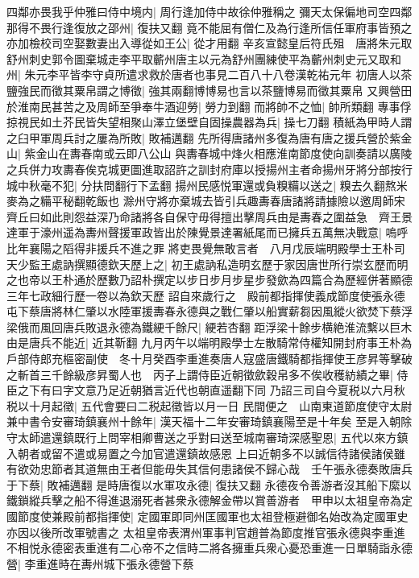 四鄰亦畏我乎仲雅曰侍中境内|{
	周行逢加侍中故徐仲雅稱之}
彌天太保徧地司空四鄰那得不畏行逢復放之邵州|{
	復扶又翻}
竟不能屈有僧仁及為行逢所信任軍府事皆預之亦加檢校司空娶數妻出入導從如王公|{
	從才用翻}
辛亥宣懿皇后符氏殂　唐將朱元取舒州刺史郭令圖棄城走李平取蘄州唐主以元為舒州團練使平為蘄州刺史元又取和州|{
	朱元李平皆李守貞所遣求救於唐者也事見二百八十八卷漢乾祐元年}
初唐人以茶鹽強民而徵其粟帛謂之博徵|{
	強其兩翻博博易也言以茶鹽博易而徵其粟帛}
又興營田於淮南民甚苦之及周師至爭奉牛酒迎勞|{
	勞力到翻}
而將帥不之恤|{
	帥所類翻}
專事俘掠視民如土芥民皆失望相聚山澤立堡壁自固操農器為兵|{
	操七刀翻}
積紙為甲時人謂之臼甲軍周兵討之屢為所敗|{
	敗補邁翻}
先所得唐諸州多復為唐有唐之援兵營於紫金山|{
	紫金山在夀春南或云即八公山}
與夀春城中烽火相應淮南節度使向訓奏請以廣陵之兵併力攻夀春俟克城更圖進取詔許之訓封府庫以授揚州主者命揚州牙將分部按行城中秋毫不犯|{
	分扶問翻行下孟翻}
揚州民感悦軍還或負糗糒以送之|{
	糗去久翻熬米麥為之糒平秘翻乾飯也}
滁州守將亦棄城去皆引兵趣夀春唐諸將請據險以邀周師宋齊丘曰如此則怨益深乃命諸將各自保守毋得擅出擊周兵由是夀春之圍益急　齊王景達軍于濠州遥為夀州聲援軍政皆出於陳覺景達署紙尾而已擁兵五萬無决戰意|{
	嗚呼比年襄陽之䧟得非援兵不進之罪}
將吏畏覺無敢言者　八月戊辰端明殿學士王朴司天少監王處訥撰顯德欽天歷上之|{
	初王處訥私造明玄歷于家因唐世所行崇玄歷而明之也帝以王朴通於歷數乃詔朴撰定以步日步月步星步發歛為四篇合為歷經併著顯德三年七政細行歷一卷以為欽天歷}
詔自來歲行之　殿前都指揮使義成節度使張永德屯下蔡唐將林仁肇以水陸軍援夀春永德與之戰仁肇以船實薪芻因風縱火欲焚下蔡浮梁俄而風回唐兵敗退永德為鐵綆千餘尺|{
	綆若杏翻}
距浮梁十餘步横絶淮流繫以巨木由是唐兵不能近|{
	近其靳翻}
九月丙午以端明殿學士左散騎常侍權知開封府事王朴為戶部侍郎充樞密副使　冬十月癸酉李重進奏唐人寇盛唐鐵騎都指揮使王彦昇等擊破之斬首三千餘級彦昇蜀人也　丙子上謂侍臣近朝徵歛穀帛多不俟收穫紡績之畢|{
	侍臣之下有曰字文意乃足近朝猶言近代也朝直遥翻下同}
乃詔三司自今夏税以六月秋税以十月起徵|{
	五代會要曰二税起徵皆以月一日}
民間便之　山南東道節度使守太尉兼中書令安審琦鎮襄州十餘年|{
	漢天福十二年安審琦鎮襄陽至是十年矣}
至是入朝除守太師遣還鎮既行上問宰相卿曹送之乎對曰送至城南審琦深感聖恩|{
	五代以來方鎮入朝者或留不遣或易置之今加官遣還鎮故感恩}
上曰近朝多不以誠信待諸侯諸侯雖有欲効忠節者其道無由王者但能毋失其信何患諸侯不歸心哉　壬午張永德奏敗唐兵于下蔡|{
	敗補邁翻}
是時唐復以水軍攻永德|{
	復扶又翻}
永德夜令善游者沒其船下縻以鐵鎖縱兵擊之船不得進退溺死者甚衆永德解金帶以賞善游者　甲申以太祖皇帝為定國節度使兼殿前都指揮使|{
	定國軍即同州匡國軍也太祖登極避御名始改為定國軍史亦因以後所改軍號書之}
太祖皇帝表渭州軍事判官趙普為節度推官張永德與李重進不相悦永德密表重進有二心帝不之信時二將各擁重兵衆心憂恐重進一日單騎詣永德營|{
	李重進時在夀州城下張永德營下蔡}
